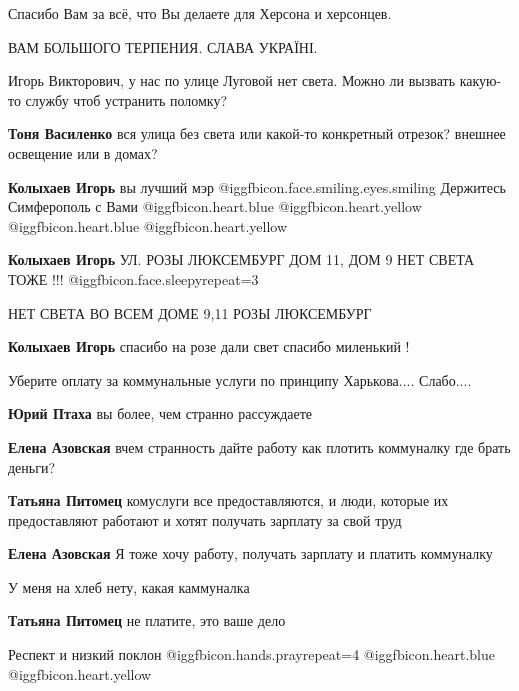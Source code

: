 \begin{itemize}
Спасибо Вам за всё, что Вы делаете для Херсона и херсонцев.

ВАМ БОЛЬШОГО ТЕРПЕНИЯ. СЛАВА УКРАЇНІ.


Игорь Викторович, у нас по улице Луговой нет света. Можно ли вызвать какую-то
службу чтоб устранить поломку?

\begin{itemize} %
\textbf{Тоня Василенко} вся улица без света или какой-то конкретный отрезок? внешнее освещение или в домах?

\textbf{Колыхаев Игорь} вы лучший мэр @igg{fbicon.face.smiling.eyes.smiling}  Держитесь Симферополь с Вами @igg{fbicon.heart.blue}  @igg{fbicon.heart.yellow}  @igg{fbicon.heart.blue}  @igg{fbicon.heart.yellow} 

\textbf{Колыхаев Игорь} УЛ. РОЗЫ ЛЮКСЕМБУРГ ДОМ 11, ДОМ 9 НЕТ СВЕТА ТОЖЕ !!! @igg{fbicon.face.sleepy}{repeat=3} 

НЕТ СВЕТА ВО ВСЕМ ДОМЕ 9,11 РОЗЫ ЛЮКСЕМБУРГ

\textbf{Колыхаев Игорь} спасибо на розе дали свет спасибо миленький !
\end{itemize} %


Уберите оплату за коммунальные услуги по принципу Харькова.... Слабо....

\begin{itemize} %
\textbf{Юрий Птаха} вы более, чем странно рассуждаете

\textbf{Елена Азовская} вчем странность дайте работу как плотить коммуналку где брать деньги?

\textbf{Татьяна Питомец} комуслуги все предоставляются, и люди, которые их предоставляют работают и хотят получать зарплату за свой труд

\textbf{Елена Азовская} Я тоже хочу работу, получать зарплату и платить коммуналку

У меня на хлеб нету, какая каммуналка

\textbf{Татьяна Питомец} не платите, это ваше дело

\end{itemize} %

Респект и низкий поклон  @igg{fbicon.hands.pray}{repeat=4}  @igg{fbicon.heart.blue}  @igg{fbicon.heart.yellow} 


\end{itemize}
